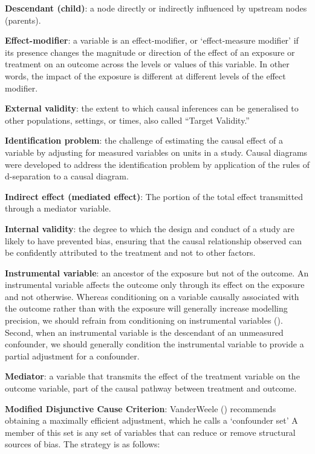 \documentclass[
  singlecolumn]{article}
\begin{document}
\textbf{Descendant (child)}: a node directly or indirectly influenced by
upstream nodes (parents).

\textbf{Effect-modifier}: a variable is an effect-modifier, or
`effect-measure modifier' if its presence changes the magnitude or
direction of the effect of an exposure or treatment on an outcome across
the levels or values of this variable. In other words, the impact of the
exposure is different at different levels of the effect modifier.

\textbf{External validity}: the extent to which causal inferences can be
generalised to other populations, settings, or times, also called
``Target Validity.''

\textbf{Identification problem}: the challenge of estimating the causal
effect of a variable by adjusting for measured variables on units in a
study. Causal diagrams were developed to address the identification
problem by application of the rules of d-separation to a causal diagram.

\textbf{Indirect effect (mediated effect)}: The portion of the total
effect transmitted through a mediator variable.

\textbf{Internal validity}: the degree to which the design and conduct
of a study are likely to have prevented bias, ensuring that the causal
relationship observed can be confidently attributed to the treatment and
not to other factors.

\textbf{Instrumental variable}: an ancestor of the exposure but not of
the outcome. An instrumental variable affects the outcome only through
its effect on the exposure and not otherwise. Whereas conditioning on a
variable causally associated with the outcome rather than with the
exposure will generally increase modelling precision, we should refrain
from conditioning on instrumental variables
(). Second, when
an instrumental variable is the descendant of an unmeasured confounder,
we should generally condition the instrumental variable to provide a
partial adjustment for a confounder.

\textbf{Mediator}: a variable that transmits the effect of the treatment
variable on the outcome variable, part of the causal pathway between
treatment and outcome.

\textbf{Modified Disjunctive Cause Criterion}: VanderWeele
() recommends obtaining a maximally
efficient adjustment, which he calls a `confounder set' A member of this
set is any set of variables that can reduce or remove structural sources
of bias. The strategy is as follows:
\end{document}
